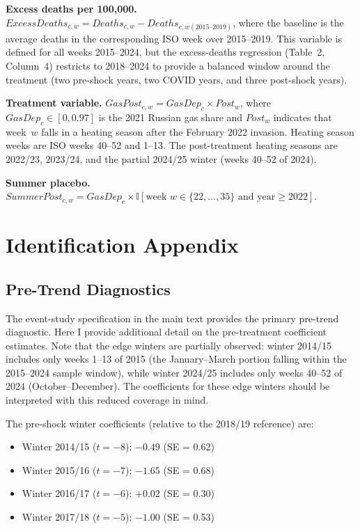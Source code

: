 \documentclass[12pt]{article}
\newcommand{\ind}{\mathbb{I}}
\begin{document}
\textbf{Excess deaths per 100,000.} $ExcessDeaths_{c,w} = Deaths_{c,w} - \overline{Deaths}_{c,w(2015\text{--}2019)}$, where the baseline is the average deaths in the corresponding ISO week over 2015--2019. This variable is defined for all weeks 2015--2024, but the excess-deaths regression (Table~2, Column~4) restricts to 2018--2024 to provide a balanced window around the treatment (two pre-shock years, two COVID years, and three post-shock years).

\textbf{Treatment variable.} $GasPost_{c,w} = GasDep_c \times Post_w$, where $GasDep_c \in [0, 0.97]$ is the 2021 Russian gas share and $Post_w$ indicates that week~$w$ falls in a heating season after the February 2022 invasion. Heating season weeks are ISO weeks 40--52 and 1--13. The post-treatment heating seasons are 2022/23, 2023/24, and the partial 2024/25 winter (weeks 40--52 of 2024).

\textbf{Summer placebo.} $SummerPost_{c,w} = GasDep_c \times \ind[\text{week } w \in \{22, \ldots, 35\} \text{ and year} \geq 2022]$.


\section{Identification Appendix}
\label{sec:app_id}

\subsection{Pre-Trend Diagnostics}

The event-study specification in the main text provides the primary pre-trend diagnostic. Here I provide additional detail on the pre-treatment coefficient estimates. Note that the edge winters are partially observed: winter 2014/15 includes only weeks 1--13 of 2015 (the January--March portion falling within the 2015--2024 sample window), while winter 2024/25 includes only weeks 40--52 of 2024 (October--December). The coefficients for these edge winters should be interpreted with this reduced coverage in mind.

The pre-shock winter coefficients (relative to the 2018/19 reference) are:
\begin{itemize}
\item Winter 2014/15 ($t = -8$): $-0.49$ (SE = 0.62)
\item Winter 2015/16 ($t = -7$): $-1.65$ (SE = 0.68)
\item Winter 2016/17 ($t = -6$): $+0.02$ (SE = 0.30)
\item Winter 2017/18 ($t = -5$): $-1.00$ (SE = 0.53)
\end{itemize}
\end{document}
